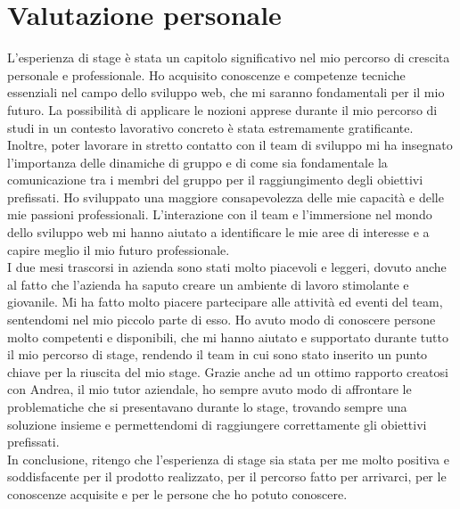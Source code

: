 
\section{Valutazione personale}
L'esperienza di stage è stata un capitolo significativo nel mio percorso di crescita personale e professionale.
Ho acquisito conoscenze e competenze tecniche essenziali nel campo dello sviluppo web, che mi saranno fondamentali per il mio futuro.
La possibilità di applicare le nozioni apprese durante il mio percorso di studi in un contesto lavorativo concreto è stata estremamente gratificante.
Inoltre, poter lavorare in stretto contatto con il team di sviluppo mi ha insegnato l'importanza delle dinamiche di gruppo e di come sia fondamentale la comunicazione tra i membri del gruppo per il raggiungimento degli obiettivi prefissati.
Ho sviluppato una maggiore consapevolezza delle mie capacità e delle mie passioni professionali. L'interazione con il team e l'immersione nel mondo dello sviluppo web
mi hanno aiutato a identificare le mie aree di interesse e a capire meglio il mio futuro professionale.\\

I due mesi trascorsi in azienda sono stati molto piacevoli e leggeri, dovuto anche al fatto che l'azienda ha saputo creare un ambiente di lavoro stimolante e giovanile.
Mi ha fatto molto piacere partecipare alle attività ed eventi del team, sentendomi nel mio piccolo parte di esso.
Ho avuto modo di conoscere persone molto competenti e disponibili, che mi hanno aiutato e supportato durante tutto il mio percorso di stage, rendendo il team in cui sono stato inserito un punto chiave per la riuscita del mio stage.
Grazie anche ad un ottimo rapporto creatosi con Andrea, il mio tutor aziendale, ho sempre avuto modo di affrontare le problematiche che si presentavano durante lo stage, trovando sempre una soluzione insieme e permettendomi di raggiungere correttamente gli obiettivi prefissati.\\

In conclusione, ritengo che l'esperienza di stage sia stata per me molto positiva e soddisfacente per il prodotto realizzato, per il percorso fatto per arrivarci, per le conoscenze acquisite e per le persone che ho potuto conoscere.
